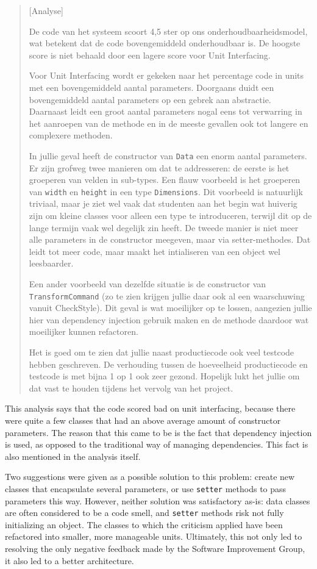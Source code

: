 \begin{quotation}
[Analyse]

De code van het systeem scoort 4,5 ster op ons onderhoudbaarheidsmodel, wat
betekent dat de code bovengemiddeld onderhoudbaar is. De hoogste score is niet
behaald door een lagere score voor Unit Interfacing.

Voor Unit Interfacing wordt er gekeken naar het percentage code in units met een
bovengemiddeld aantal parameters. Doorgaans duidt een bovengemiddeld aantal
parameters op een gebrek aan abstractie. Daarnaast leidt een groot aantal
parameters nogal eens tot verwarring in het aanroepen van de methode en in de
meeste gevallen ook tot langere en complexere methoden.

In jullie geval heeft de constructor van \texttt{Data} een enorm aantal
parameters. Er zijn grofweg twee manieren om dat te addresseren: de eerste is
het groeperen van velden in sub-types. Een flauw voorbeeld is het groeperen van
\texttt{width} en \texttt{height} in een type \texttt{Dimensions}.
Dit voorbeeld is natuurlijk triviaal, maar je ziet wel vaak dat studenten aan
het begin wat huiverig zijn om kleine classes voor alleen een type te
introduceren, terwijl dit op de lange termijn vaak wel degelijk zin heeft. De
tweede manier is niet meer alle parameters in de constructor meegeven, maar via
setter-methodes. Dat leidt tot meer code, maar maakt het intialiseren van een
object wel leesbaarder.

Een ander voorbeeld van dezelfde situatie is de constructor van
\texttt{TransformCommand} (zo te zien krijgen jullie daar ook al een
waarschuwing vanuit CheckStyle). Dit geval is wat moeilijker op te lossen,
aangezien jullie hier van dependency injection gebruik maken en de methode
daardoor wat moeilijker kunnen refactoren.

Het is goed om te zien dat jullie naast productiecode ook veel testcode hebben
geschreven. De verhouding tussen de hoeveelheid productiecode en testcode is met
bijna 1 op 1 ook zeer gezond. Hopelijk lukt het jullie om dat vast te houden
tijdens het vervolg van het project.
\end{quotation}

This analysis says that the code scored bad on unit interfacing, because there
were quite a few classes that had an above average amount of constructor
parameters. The reason that this came to be is the fact that dependency
injection is used, as opposed to the traditional way of managing dependencies.
This fact is also mentioned in the analysis itself.

Two suggestions were given as a possible solution to this problem: create new
classes that encapsulate several parameters, or use \texttt{setter} methods
to pass parameters this way. However, neither solution was satisfactory as-is:
data classes are often considered to be a code smell, and \texttt{setter}
methods risk not fully initializing an object. The classes to which the
criticism applied have been refactored into smaller, more manageable units.
Ultimately, this not only led to resolving the only negative feedback made by
the Software Improvement Group, it also led to a better architecture.

